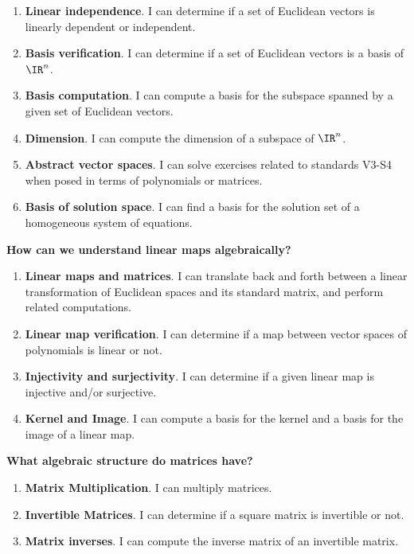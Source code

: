 \begin{multicols}{2}
\begin{enumerate}
\item {\bf Linear independence}. I can determine if a set of Euclidean vectors is linearly dependent or independent.
\item {\bf Basis verification}. I can determine if a set of Euclidean vectors is a basis of \(\IR^n\).
\item {\bf Basis computation}.  I can compute a basis for the subspace spanned by a given set of Euclidean vectors.
\item {\bf Dimension}.  I can compute the dimension of a subspace of \(\IR^n\).
\item {\bf Abstract vector spaces}. I can solve exercises related to standards V3-S4 when posed in terms of polynomials or matrices.
\item {\bf Basis of solution space}. I can find a basis for the solution set of a homogeneous system of equations.
\end{enumerate}

\noindent\textbf{How can we understand linear maps algebraically?}
\begin{enumerate}
\item {\bf Linear maps and matrices}. I can translate back and forth between a
linear transformation of Euclidean spaces and its standard matrix, and perform related computations.
\item {\bf Linear map verification}. I can determine if a map between vector spaces of polynomials is linear or not.
\item {\bf Injectivity and surjectivity}.  I can determine if a given linear map is injective and/or surjective.
\item {\bf Kernel and Image}. I can compute a basis for the kernel and a basis for the image of a linear map.
\end{enumerate}


\noindent\textbf{What algebraic structure do matrices have?}
\begin{enumerate}
\item {\bf Matrix Multiplication}. I can multiply matrices.
\item {\bf Invertible Matrices}. I can determine if a square matrix is invertible or not.
\item {\bf Matrix inverses}.  I can compute the inverse matrix of an invertible matrix.
\end{enumerate}



\end{multicols}

